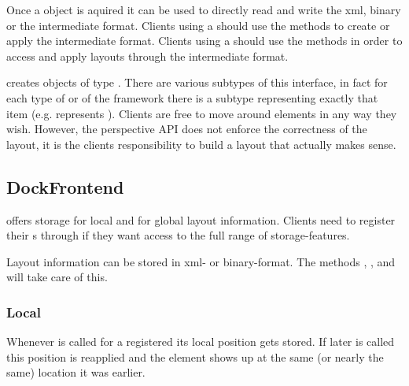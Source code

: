 
Once a  object is aquired it can be used to directly read and write the xml, binary or the intermediate format. Clients using a  should use the  methods to create or apply the intermediate format. Clients using a  should use the  methods in order to access and apply layouts through the intermediate format.

 creates objects of type . There are various subtypes of this interface, in fact for each type of  or  of the framework there is a subtype representing exactly that item (e.g. \linebreak {} represents ). Clients are free to move around elements in any way they wish. However, the perspective API does not enforce the correctness of the layout, it is the clients responsibility to build a layout that actually makes sense.


\subsection{DockFrontend} \label{sec:DockFrontend}
 offers storage for local and for global layout information. Clients need to register their s through  if they want access to the full range of storage-features.

Layout information can be stored in xml- or binary-format. The methods , ,  and  will take care of this.

\subsubsection{Local}
Whenever  is called for a registered  its local position gets stored. If later  is called this position is reapplied and the element shows up at the same (or nearly the same) location it was earlier.

